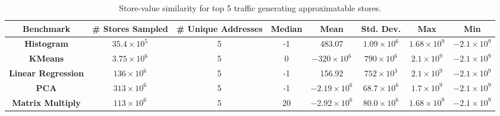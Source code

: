 \begin{table}[htbp]
\caption{Store-value similarity for top 5 traffic generating approximatable stores.}
	\begin{center}
		\begin{tabular}{|c|c|c|c|c|c|c|c|}
			\hline
			\textbf{Benchmark} & \textbf{\# Stores Sampled}& \textbf{\# Unique Addresses} & \textbf{Median} & \textbf{Mean} & \textbf{Std. Dev.} & \textbf{Max} & \textbf{Min} \\
			\hline

			\textbf{Histogram} & $35.4\times10^5$ & 5 & -1 & 483.07 & $1.09 \times 10^6$ & $1.68 \times 10^9$ & $-2.1 \times 10^9$\\
			\hline

			\textbf{KMeans} & $3.75\times10^6$ & 5 & 0 & $-320 \times 10^6$ & $790 \times 10^6$ & $2.1 \times 10^9$ & $-2.1 \times 10^9$\\
			\hline

			\textbf{Linear Regression} & $136\times10^6$ & 5 & -1 & 156.92 & $752 \times 10^3$ & $2.1 \times 10^9$ & $-2.1 \times 10^9$\\
			\hline

			\textbf{PCA} & $313\times10^6$ & 5 & -1 & $-2.19 \times 10^6$ & $68.7 \times 10^6$ & $1.7 \times 10^9$ & $-2.1 \times 10^9$\\
			\hline

			\textbf{Matrix Multiply} & $113\times10^6$ & 5 & 20 & $-2.92 \times 10^6$ & $80.0 \times 10^6$ & $1.68 \times 10^9$ & $-2.1 \times 10^9$\\
			\hline

		\end{tabular}
	\label{tab:val_sim_top5}
	\end{center}
\end{table}


